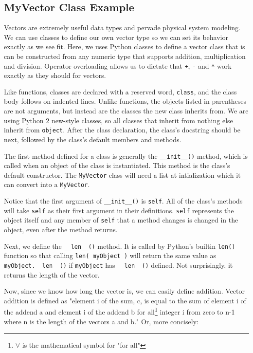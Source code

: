 \subsection{MyVector Class Example}

Vectors are extremely useful data types and pervade physical system modeling. We can use classes to define our own vector type so we can set its behavior exactly as we see fit. Here, we uses Python classes to define a vector class that is can be constructed from any numeric type that supports addition, multiplication and division. Operator overloading allows us to dictate that \verb|+|, \verb|-| and \verb|*| work exactly as they should for vectors.

Like functions, classes are declared with a reserved word, \verb|class|, and the class body follows on indented lines. Unlike functions, the objects listed in parentheses are not arguments, but instead are the classes the new class inherits from. We are using Python 2 new-style classes, so all classes that inherit from nothing else inherit from \verb|object|. After the class declaration, the class's docstring should be next, followed by the class's default members and methods.

The first method defined for a class is generally the \verb|__init__()| method, which is called when an object of the class is instantiated. This method is the class's default constructor. The \verb|MyVector| class will need a list at intialization which it can convert into a \verb|MyVector|.

Notice that the first argument of \verb|__init__()| is \verb|self|. All of the class's methods will take \verb|self| as their first argument in their definitions. \verb|self| represents the object itself and any member of \verb|self| that a method changes is changed in the object, even after the method returns.

Next, we define the \verb|__len__()| method. It is called by Python's builtin \verb|len()| function so that calling \verb|len( myObject )| will return the same value as \verb|myObject.__len__()| if \verb|myObject| has \verb|__len__()| defined. Not surprisingly, it returns the length of the vector.

Now, since we know how long the vector is, we can easily define addition. Vector addition is defined as "element i of the sum, c, is equal to the sum of element i of the addend a and element i of the addend b for all\footnote{\begin{math}\forall\end{math} is the mathematical symbol for "for all"} integer i from zero to n-1 where n is the length of the vectors a and b." Or, more concisely:

